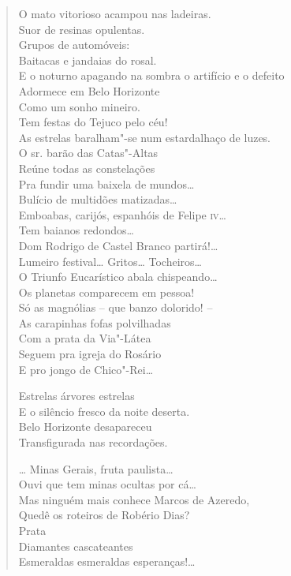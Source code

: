 {\begin{verse}
O mato vitorioso acampou nas ladeiras.\\
Suor de resinas opulentas.\\
Grupos de automóveis:\\
Baitacas e jandaias do rosal.\\
E o noturno apagando na sombra o artifício e o defeito\\
Adormece em Belo Horizonte\\
Como um sonho mineiro.\\
Tem festas do Tejuco pelo céu!\\
As estrelas baralham"-se num estardalhaço de luzes.\\
O sr. barão das Catas"-Altas\\
Reúne todas as constelações\\
Pra fundir uma baixela de mundos\ldots{}\\
Bulício de multidões matizadas\ldots{}\\
Emboabas, carijós, espanhóis de Felipe \textsc{iv}\ldots{}\\
Tem baianos redondos\ldots{}\\
Dom Rodrigo de Castel Branco partirá!\ldots{}\\
Lumeiro festival\ldots{} Gritos\ldots{} Tocheiros\ldots{}\\
O Triunfo Eucarístico abala chispeando\ldots{}\\
Os planetas comparecem em pessoa!\\
Só as magnólias -- que banzo dolorido! --\\
As carapinhas fofas polvilhadas\\
Com a prata da Via"-Látea\\
Seguem pra igreja do Rosário\\
E pro jongo de Chico"-Rei\ldots{}

Estrelas árvores estrelas\\
E o silêncio fresco da noite deserta.\\
Belo Horizonte desapareceu\\
Transfigurada nas recordações.

\ldots{} Minas Gerais, fruta paulista\ldots{}\\
Ouvi que tem minas ocultas por cá\ldots{}\\
Mas ninguém mais conhece Marcos de Azeredo,\\
Quedê os roteiros de Robério Dias?\\
\qquad\qquad\quad{}Prata\\
\qquad\quad{}Diamantes cascateantes\\
Esmeraldas esmeraldas esperanças!\ldots{}


\end{verse}}
